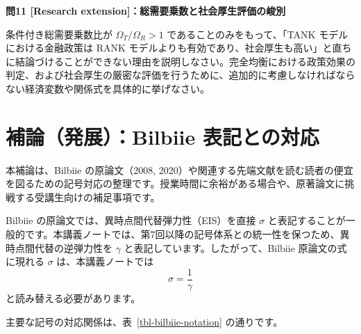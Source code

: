\documentclass[
  japanese,
  lualatex,
  ja=standard,
  12pt,
  a4paper]{ltjsarticle}
\begin{document}

\textbf{問11 {[}Research extension{]}：総需要乗数と社会厚生評価の峻別}

条件付き総需要乗数比が \(\Omega_T / \Omega_R > 1\)
であることのみをもって、「TANK モデルにおける金融政策は RANK
モデルよりも有効であり、社会厚生も高い」と直ちに結論づけることができない理由を説明しなさい。完全均衡における政策効果の判定、および社会厚生の厳密な評価を行うために、追加的に考慮しなければならない経済変数や関係式を具体的に挙げなさい。

\clearpage

\section{補論（発展）：Bilbiie
表記との対応}\label{ux88dcux8ad6ux767aux5c55bilbiie-ux8868ux8a18ux3068ux306eux5bfeux5fdc}

本補論は、Bilbiie の原論文（2008,
2020）や関連する先端文献を読む読者の便宜を図るための記号対応の整理です。授業時間に余裕がある場合や、原著論文に挑戦する受講生向けの補足事項です。

Bilbiie の原論文では、異時点間代替弾力性（EIS）を直接 \(\sigma\)
と表記することが一般的です。本講義ノートでは、第7回以降の記号体系との統一性を保つため、異時点間代替の逆弾力性を
\(\gamma\) と表記しています。したがって、Bilbiie 原論文の式に現れる
\(\sigma\) は、本講義ノートでは \[
\sigma = \frac{1}{\gamma}
\] と読み替える必要があります。

主要な記号の対応関係は、表~\ref{tbl-bilbiie-notation} の通りです。
\end{document}
